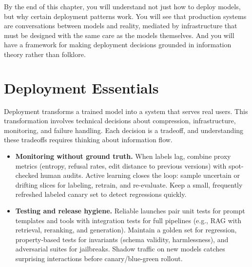 By the end of this chapter, you will understand not just how to deploy models, but why certain deployment patterns work. You will see that production systems are conversations between models and reality, mediated by infrastructure that must be designed with the same care as the models themselves. And you will have a framework for making deployment decisions grounded in information theory rather than folklore.

\vspace{2em}

\section{Deployment Essentials}


Deployment transforms a trained model into a system that serves real users. This transformation involves technical decisions about compression, infrastructure, monitoring, and failure handling. Each decision is a tradeoff, and understanding these tradeoffs requires thinking about information flow.

\begin{pausebox}[title=Deployment checklist (fast)]
\begin{itemize}
\item \textbf{Monitoring without ground truth.} When labels lag, combine proxy metrics (entropy, refusal rates, edit distance to previous versions) with spot-checked human audits. Active learning closes the loop: sample uncertain or drifting slices for labeling, retrain, and re-evaluate. Keep a small, frequently refreshed labeled canary set to detect regressions quickly.
\item \textbf{Testing and release hygiene.} Reliable launches pair unit tests for prompt templates and tools with integration tests for full pipelines (e.g., RAG with retrieval, reranking, and generation). Maintain a golden set for regression, property-based tests for invariants (schema validity, harmlessness), and adversarial suites for jailbreaks. Shadow traffic on new models catches surprising interactions before canary/blue-green rollout.
\end{itemize}
\end{pausebox}

\vspace{1em}

